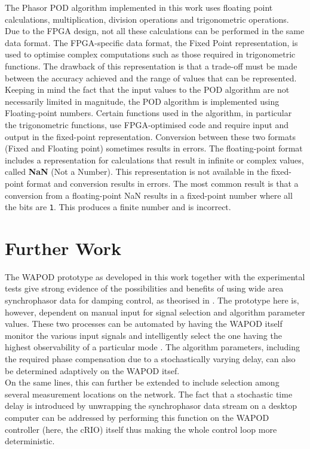 \documentclass[journal]{IEEEtran}
\begin{document}
The Phasor POD algorithm implemented in this work uses floating point calculations, multiplication, division operations and  trigonometric operations. Due to the FPGA design, not all these calculations can be performed in the same data format. The FPGA-specific data format, the Fixed Point representation, is used to optimise complex computations such as those required in trigonometric functions. The drawback of this representation is that a trade-off must be made between the accuracy achieved and the range of values that can be represented. Keeping in mind the fact that the input values to the POD algorithm are not necessarily limited in magnitude, the POD algorithm is implemented using Floating-point numbers. Certain functions used in the algorithm, in particular the trigonometric functions, use FPGA-optimised code and require input and output in the fixed-point representation. Conversion between these two formats (Fixed and Floating point) sometimes results in errors. The floating-point format includes a representation for calculations that result in infinite or complex values, called \textbf{NaN} (Not a Number)\cite{LabVIEWCourse}. This representation is not available in the fixed-point format and conversion results in errors. The most common result is that a conversion from a floating-point NaN results in a fixed-point number where all the bits are \texttt{1}. This produces a finite number and is incorrect. 

\section{Further Work}\label{Future}

The WAPOD prototype as developed in this work together with the experimental tests give strong evidence of the possibilities and benefits of using wide area synchrophasor data for damping control, as theorised in \cite{Yuwa}. The prototype here is, however, dependent on manual input for signal selection and algorithm parameter values. These two processes can be automated by having the WAPOD itself monitor the various input signals and intelligently select the one having the highest observability of a particular mode \cite{Yuwa}. The algorithm parameters, including the required phase compensation due to a stochastically varying delay, can also be determined adaptively on the WAPOD itsef.\\
On the same lines, this can further be extended to include selection among several measurement locations on the network. The fact that a stochastic time delay is introduced by unwrapping the synchrophasor data stream on a desktop computer can be addressed by performing this function on the WAPOD controller (here, the cRIO) itself thus making the whole control loop more deterministic.
\end{document}

